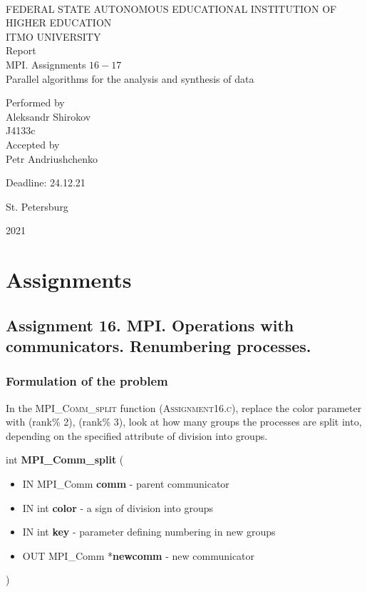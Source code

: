 \documentclass[%
12pt, %
final, %
oneside, %
onecolumn, %
centertags]{article} %
\theoremstyle{plain}
\theoremstyle{definition}
\theoremstyle{remark}
\begin{document}
	\begin{titlepage} 
		\begin{center}
		\textbf{}\\[2.0cm]
		\LARGE FEDERAL STATE AUTONOMOUS EDUCATIONAL INSTITUTION OF HIGHER EDUCATION \\[0.5cm]
		\Large ITMO UNIVERSITY \\[3cm]
		\LARGE Report\\
		\Large MPI. Assignments $16-17$ \\
		\Large Parallel algorithms for the analysis and synthesis of data \\[4cm]


		\begin{flushright}
		Performed by\\
		Aleksandr Shirokov\\
		J4133c\\
		Accepted by\\
		Petr Andriushchenko

		Deadline: 24.12.21
		\end{flushright}

		\vfill 

		{\Large {St. Petersburg}} \par
		{\Large {2021}}
		\end{center} 
	\end{titlepage}

\tableofcontents
\newpage


\section{Assignments}

\subsection{Assignment 16. MPI. Operations with communicators. Renumbering processes.}

\subsubsection{Formulation of the problem}

In the \textsc{MPI\_Comm\_split} function (\textsc{Assignment16.c}), replace the color parameter with (rank\% 2), (rank\% 3), 
look at how many groups the processes are split into, depending on the specified attribute of division into 
groups.

int \textbf{MPI\_Comm\_split} (
\begin{itemize}
	\item IN MPI\_Comm \textbf{comm} - parent communicator
	\item IN int \textbf{color} - a sign of division into groups
	\item IN int \textbf{key} - parameter defining numbering in new groups
	\item OUT MPI\_Comm *\textbf{newcomm} - new communicator
\end{itemize}
)
\end{document}
